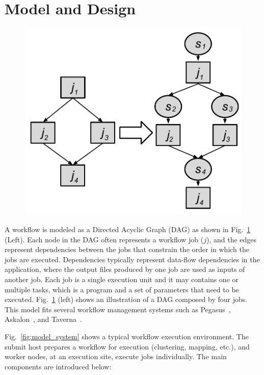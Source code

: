 
\section{Model and Design}
\label{sec:model}


\begin{figure}[htb]
	\centering
	\includegraphics[width=0.7\linewidth]{figures/model/odag.pdf}
	\label{fig:model_odag}
	\vspace{-10pt}
\end{figure}
A workflow is modeled as a Directed Acyclic Graph (DAG) as shown in Fig.~\ref{fig:model_odag} (Left). Each node in the DAG often represents a workflow job ($j$), and the edges represent dependencies between the jobs that constrain the order in which the jobs are executed. Dependencies typically represent data-flow dependencies in the application, where the output files produced by one job are used as inputs of another job. Each job is a single execution unit and it may contains one or multiple tasks, which is a program and a set of parameters that need to be executed. Fig.~\ref{fig:model_odag} (left) shows an illustration of a DAG composed by four jobs. This model fits several workflow management systems such as Pegasus~\cite{Deelman2005}, Askalon~\cite{Fahringer2005}, and Taverna~\cite{Oinn:2006:TLC:1148437.1148448}.

Fig.~\ref{fig:model_system} shows a typical workflow execution environment. The submit host prepares a workflow for execution (clustering, mapping, etc.), and worker nodes, at an execution site, execute jobs individually. The main components are introduced below:

